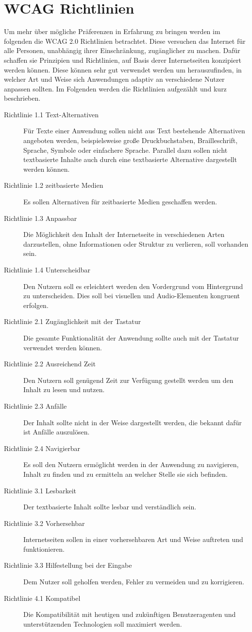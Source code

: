 \documentclass[12pt, paper=a4, bibtotoc, toc=listof, headsepline=true]{scrreprt}
\begin{document}
\section{WCAG Richtlinien}
Um mehr über mögliche Präferenzen in Erfahrung zu bringen werden im folgenden die \ac{WCAG 2.0} Richtlinien betrachtet. Diese versuchen das Internet für alle Personen, unabhängig ihrer Einschränkung, zugänglicher zu machen. Dafür schaffen sie Prinzipien und Richtlinien, auf Basis derer Internetseiten konzipiert werden können. Diese können sehr gut verwendet werden um herauszufinden, in welcher Art und Weise sich Anwendungen adaptiv an verschiedene Nutzer anpassen sollten. Im Folgenden werden die Richtlinien aufgezählt und kurz beschrieben\cite{wcag}.
\begin{description}
	\item [Richtlinie 1.1 Text-Alternativen] Für Texte einer Anwendung sollen nicht aus Text bestehende Alternativen angeboten werden, beispielsweise große Druckbuchstaben, Brailleschrift, Sprache, Symbole oder einfachere Sprache. Parallel dazu sollen nicht textbasierte Inhalte auch durch eine textbasierte Alternative dargestellt werden können.
	\item[Richtlinie 1.2 zeitbasierte Medien] Es sollen Alternativen für zeitbasierte Medien geschaffen werden.
	\item[Richtlinie 1.3 Anpassbar] Die Möglichkeit den Inhalt der Internetseite in verschiedenen Arten darzustellen, ohne Informationen oder Struktur zu verlieren, soll vorhanden sein.
	\item[Richtlinie 1.4 Unterscheidbar] Den Nutzern soll es erleichtert werden den Vordergrund vom Hintergrund zu unterscheiden. Dies soll bei visuellen und Audio-Elementen kongruent erfolgen. 
	\item[Richtlinie 2.1 Zugänglichkeit mit der Tastatur] Die gesamte Funktionalität der Anwendung sollte auch mit der Tastatur verwendet werden können.	
	\item[Richtlinie 2.2 Ausreichend Zeit] Den Nutzern soll genügend Zeit zur Verfügung gestellt werden um den Inhalt zu lesen und nutzen.
	\item[Richtlinie 2.3 Anfälle] Der Inhalt sollte nicht in der Weise dargestellt werden, die bekannt dafür ist Anfälle auszulösen.
	\item[Richtlinie 2.4 Navigierbar] Es soll den Nutzern ermöglicht werden in der Anwendung zu navigieren, Inhalt zu finden und zu ermitteln an welcher Stelle sie sich befinden.
	\item[Richtlinie 3.1 Lesbarkeit] Der textbasierte Inhalt sollte lesbar und verständlich sein.	
	\item[Richtlinie 3.2 Vorhersehbar] Internetseiten sollen in einer vorhersehbaren Art und Weise auftreten und funktionieren.
	\item[Richtlinie 3.3 Hilfestellung bei der Eingabe] Dem Nutzer soll geholfen werden, Fehler zu vermeiden und zu korrigieren.
	\item[Richtlinie 4.1 Kompatibel] Die Kompatibilität mit heutigen und zukünftigen Benutzeragenten und unterstützenden Technologien soll maximiert werden.
\end{description}
\end{document}
